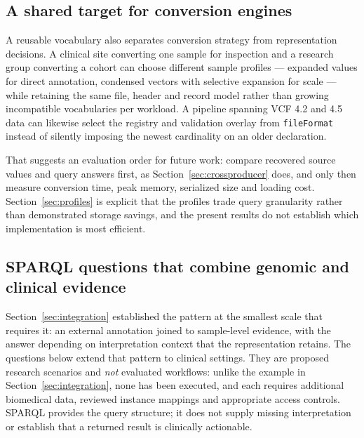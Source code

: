 \documentclass{ceurart}
\newcommand{\term}[1]{\texttt{#1}}
\begin{document}
\subsection{A shared target for conversion engines}

A reusable vocabulary also separates conversion strategy from representation decisions. A clinical site converting one sample for inspection and a research group converting a cohort can choose different sample profiles --- expanded values for direct annotation, condensed vectors with selective expansion for scale --- while retaining the same file, header and record model rather than growing incompatible vocabularies per workload. A pipeline spanning VCF 4.2 and 4.5 data can likewise select the registry and validation overlay from \term{fileFormat} instead of silently imposing the newest cardinality on an older declaration.

That suggests an evaluation order for future work: compare recovered source values and query answers first, as Section~\ref{sec:crossproducer} does, and only then measure conversion time, peak memory, serialized size and loading cost. Section~\ref{sec:profiles} is explicit that the profiles trade query granularity rather than demonstrated storage savings, and the present results do not establish which implementation is most efficient.

\subsection{SPARQL questions that combine genomic and clinical evidence}
\label{sec:clinicalqueries}

Section~\ref{sec:integration} established the pattern at the smallest scale that requires it: an external annotation joined to sample-level evidence, with the answer depending on interpretation context that the representation retains. 
The questions below extend that pattern to clinical settings. 
They are proposed research scenarios and \emph{not} evaluated workflows: unlike the example in Section~\ref{sec:integration}, none has been executed, and each requires additional biomedical data, reviewed instance mappings and appropriate access controls. 
SPARQL provides the query structure; it does not supply missing interpretation or establish that a returned result is clinically actionable.
\end{document}
